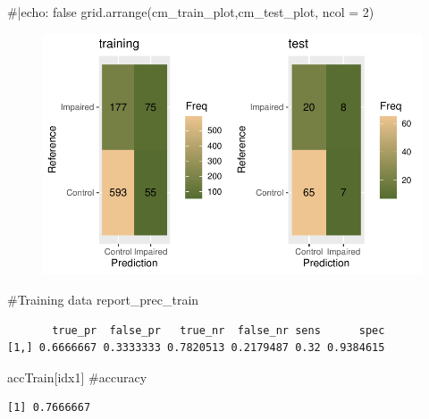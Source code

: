 \documentclass[
  letterpaper,
  DIV=11,
  numbers=noendperiod]{scrartcl}
\newenvironment{Shaded}{\begin{snugshade}}{\end{snugshade}}
\newcommand{\AttributeTok}[1]{\textcolor[rgb]{0.40,0.45,0.13}{#1}}
\newcommand{\CommentTok}[1]{\textcolor[rgb]{0.37,0.37,0.37}{#1}}
\newcommand{\DecValTok}[1]{\textcolor[rgb]{0.68,0.00,0.00}{#1}}
\newcommand{\FunctionTok}[1]{\textcolor[rgb]{0.28,0.35,0.67}{#1}}
\newcommand{\NormalTok}[1]{\textcolor[rgb]{0.00,0.23,0.31}{#1}}
\begin{document}
\begin{Shaded}
\begin{Highlighting}[]
\CommentTok{\#|echo: false}
\FunctionTok{grid.arrange}\NormalTok{(cm\_train\_plot,cm\_test\_plot, }\AttributeTok{ncol =} \DecValTok{2}\NormalTok{)}
\end{Highlighting}
\end{Shaded}

\begin{figure}[H]

{\centering \includegraphics{excercise_doc_files/figure-pdf/unnamed-chunk-16-1.pdf}

}

\end{figure}

\begin{Shaded}
\begin{Highlighting}[]
\CommentTok{\#Training data}
\NormalTok{report\_prec\_train}
\end{Highlighting}
\end{Shaded}

\begin{verbatim}
       true_pr  false_pr   true_nr  false_nr sens      spec
[1,] 0.6666667 0.3333333 0.7820513 0.2179487 0.32 0.9384615
\end{verbatim}

\begin{Shaded}
\begin{Highlighting}[]
\NormalTok{accTrain[idx1] }\CommentTok{\#accuracy}
\end{Highlighting}
\end{Shaded}

\begin{verbatim}
[1] 0.7666667
\end{verbatim}
\end{document}
